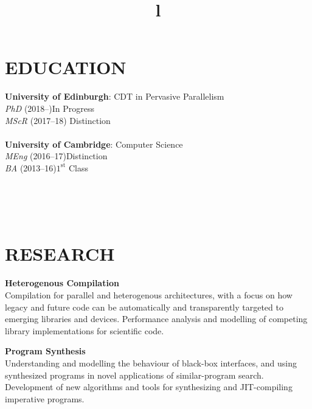 \documentclass[margin]{res}
\begin{document}
\begin{resume}

\section{EDUCATION}
\textbf{University of Edinburgh}: CDT in Pervasive Parallelism \\
{\sl PhD} (2018--)\hfill In Progress
\\
{\sl MScR} (2017--18)\hfill
Distinction \\\\
\textbf{University of Cambridge}: Computer Science \\
{\sl MEng} (2016--17)\hfill Distinction \\
{\sl BA} (2013--16)\hfill $1^{\mathrm{st}}$ Class


\begin{format}
\title{l}\\
\\
\body\\
\end{format}

\section{RESEARCH}

\par
\textbf{Heterogenous Compilation}\\
Compilation for parallel and heterogenous architectures, with a focus on how
legacy and future code can be automatically and transparently targeted to
emerging libraries and devices. Performance analysis and modelling of
competing library implementations for scientific code.

\par
\textbf{Program Synthesis}\\
Understanding and modelling the behaviour of black-box interfaces, and using
synthesized programs in novel applications of similar-program search.
Development of new algorithms and tools for synthesizing and JIT-compiling
imperative programs.


\end{resume}
\end{document}
